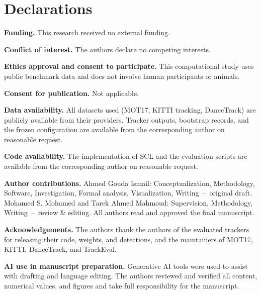 \documentclass[pdflatex,sn-mathphys-num,iicol]{sn-jnl}
\newcommand{\scl}{SCL}
\begin{document}
\maketitle










\backmatter

\section*{Declarations}

\noindent\textbf{Funding.} This research received no external funding.

\noindent\textbf{Conflict of interest.} The authors declare no competing interests.

\noindent\textbf{Ethics approval and consent to participate.} This computational study uses public benchmark data and does not involve human participants or animals.

\noindent\textbf{Consent for publication.} Not applicable.

\noindent\textbf{Data availability.} All datasets used (MOT17, KITTI tracking, DanceTrack) are publicly available from their providers. Tracker outputs, bootstrap records, and the frozen configuration are available from the corresponding author on reasonable request.

\noindent\textbf{Code availability.} The implementation of \scl{} and the evaluation scripts are available from the corresponding author on reasonable request.

\noindent\textbf{Author contributions.} Ahmed Gouda Ismail: Conceptualization, Methodology, Software, Investigation, Formal analysis, Visualization, Writing~--~original draft. Mohamed S. Mohamed and Tarek Ahmed Mahmoud: Supervision, Methodology, Writing~--~review \& editing. All authors read and approved the final manuscript.

\noindent\textbf{Acknowledgements.} The authors thank the authors of the evaluated trackers for releasing their code, weights, and detections, and the maintainers of MOT17, KITTI, DanceTrack, and TrackEval.

\noindent\textbf{AI use in manuscript preparation.} Generative AI tools were used to assist with drafting and language editing. The authors reviewed and verified all content, numerical values, and figures and take full responsibility for the manuscript.


\end{document}
